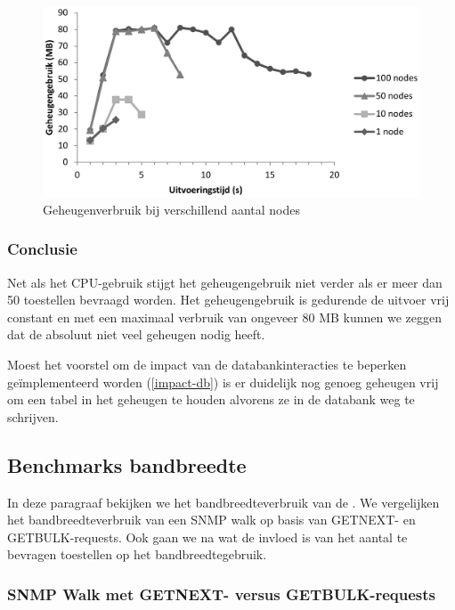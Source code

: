 \begin{figure}[h]
	\centering
	\includegraphics[scale=0.40]{figures/ram-100nodes}
	\caption{Geheugenverbruik bij verschillend aantal nodes}
	\label{fig-ram-aantalnodes}
\end{figure}

\subsubsection{Conclusie}

Net als het CPU-gebruik stijgt het geheugengebruik niet verder als er meer dan 50 toestellen bevraagd worden.
Het geheugengebruik is gedurende de uitvoer vrij constant en met een maximaal verbruik van ongeveer 80 MB kunnen we zeggen dat
de \nwmretriever{} absoluut niet veel geheugen nodig heeft.

Moest het voorstel om de impact van de databankinteracties te beperken geïmplementeerd worden (\cref{impact-db}) is er duidelijk
nog genoeg geheugen vrij om een tabel in het geheugen te houden alvorens ze in de databank weg te schrijven. 


\subsection{Benchmarks bandbreedte}

In deze paragraaf bekijken we het bandbreedteverbruik van de \nwmretriever{}.
We vergelijken het bandbreedteverbruik van een SNMP walk op basis van GETNEXT- en GETBULK-requests.
Ook gaan we na wat de invloed is van het aantal te bevragen toestellen op het bandbreedtegebruik.

\subsubsection{SNMP Walk met GETNEXT- versus GETBULK-requests}

